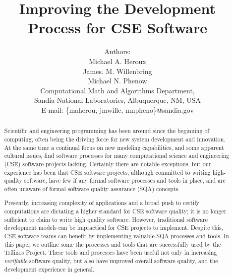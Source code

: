 \documentclass[times,10pt,twocolumn]{article}
\begin{document}
\title{Improving the Development Process for CSE Software}
\author{Authors:\\
Michael A. Heroux \\
James. M. Willenbring \\
Michael N. Phenow \\
Computational Math and Algorithms Department, \\
Sandia National Laboratories, Albuquerque, NM, USA \\
E-mail: \{maherou, jmwille, mnpheno\}@sandia.gov \\
}

\maketitle
\begin{abstract}

Scientific and engineering programming has been around since the
beginning of computing, often being the driving force for new system
development and innovation.  At the same time a continual focus on
new modeling capabilities, and some apparent cultural issues, find
software processes for many computational science and engineering
(CSE) software projects lacking.  Certainly there are notable
exceptions, but our experience has been that CSE software projects,
although committed to writing high-quality software, have few if any
formal software processes and tools in place, and are often unaware
of formal software quality assurance (SQA) concepts.

Presently, increasing complexity of applications and a broad push to
certify computations are dictating a higher standard for CSE
software quality; it is no longer sufficient to claim to write high
quality software. However, traditional software development models
can be impractical for CSE projects to implement. Despite this, CSE
software teams can benefit by implementing valuable SQA processes
and tools.  In this paper we outline some the processes and tools
that are successfully used by the Trilinos Project. These tools and
processes have been useful not only in increasing \emph{verifiable}
software quality, but also have improved overall software quality,
and the development experience in general.

\end{abstract}


\thispagestyle{empty}
\end{document}

